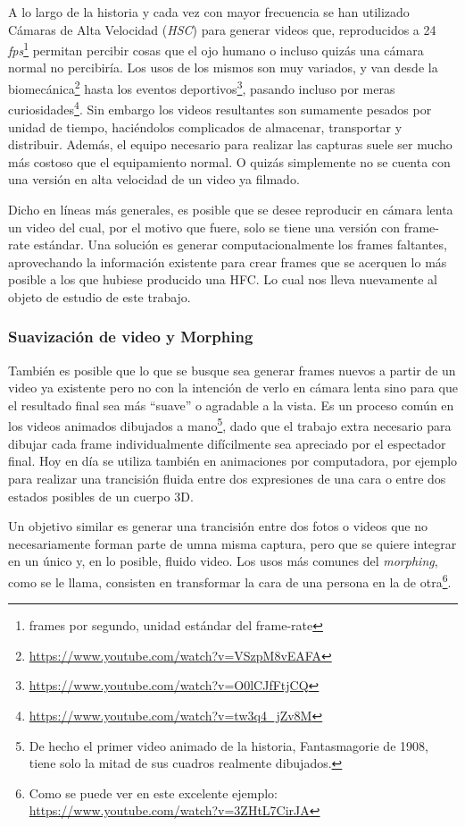 A lo largo de la historia y cada vez con mayor frecuencia se han utilizado Cámaras de Alta Velocidad (\emph{HSC}) para generar videos que, reproducidos a 24 \emph{fps}\footnote{frames por segundo, unidad estándar del frame-rate} permitan percibir cosas que el ojo humano o incluso quizás una cámara normal no percibiría. Los usos de los mismos son muy variados, y van desde la biomecánica\footnote{\url{https://www.youtube.com/watch?v=VSzpM8vEAFA}} hasta los eventos deportivos\footnote{\url{https://www.youtube.com/watch?v=O0lCJfFtjCQ}}, pasando incluso por meras curiosidades\footnote{\url{https://www.youtube.com/watch?v=tw3q4_jZv8M}}. Sin embargo los videos resultantes son sumamente pesados por unidad de tiempo, haciéndolos complicados de almacenar, transportar y distribuir. Además, el equipo necesario para realizar las capturas suele ser mucho más costoso que el equipamiento normal. O quizás simplemente no se cuenta con una versión en alta velocidad de un video ya filmado.

Dicho en líneas más generales, es posible que se desee reproducir en cámara lenta un video del cual, por el motivo que fuere, solo se tiene una versión con frame-rate estándar. Una solución es generar computacionalmente los frames faltantes, aprovechando la información existente para crear frames que se acerquen lo más posible a los que hubiese producido una HFC. Lo cual nos lleva nuevamente al objeto de estudio de este trabajo.

\subsubsection{Suavización de video y Morphing}
También es posible que lo que se busque sea generar frames nuevos a partir de un video ya existente pero no con la intención de verlo en cámara lenta sino para que el resultado final sea más ``suave'' o agradable a la vista. Es un proceso común en los videos animados dibujados a mano\footnote{De hecho el primer video animado de la historia, Fantasmagorie de 1908, tiene solo la mitad de sus cuadros realmente dibujados.}, dado que el trabajo extra necesario para dibujar cada frame individualmente difícilmente sea apreciado por el espectador final. Hoy en día se utiliza también en animaciones por computadora, por ejemplo para realizar una trancisión fluida entre dos expresiones de una cara o entre dos estados posibles de un cuerpo 3D.

Un objetivo similar es generar una trancisión entre dos fotos o videos que no necesariamente forman parte de umna misma captura, pero que se quiere integrar en un único y, en lo posible, fluido video. Los usos más comunes del \emph{morphing}, como se le llama, consisten en transformar la cara de una persona en la de otra\footnote{Como se puede ver en este excelente ejemplo: \url{https://www.youtube.com/watch?v=3ZHtL7CirJA}}.

